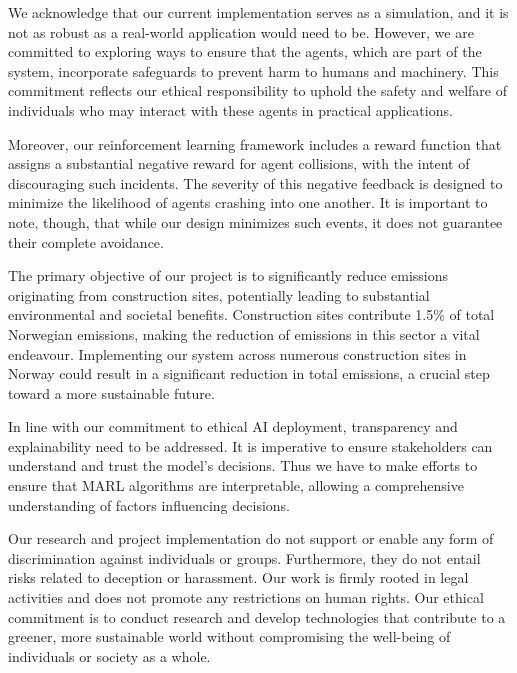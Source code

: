 \documentclass[conference]{IEEEtran}
\begin{document}
We acknowledge that our current implementation serves as a simulation, and it is not as robust as a
real-world application would need to be. However, we are committed to exploring ways to ensure that the
agents, which are part of the system, incorporate safeguards to prevent harm to humans and machinery.
This commitment reflects our ethical responsibility to uphold the safety and welfare of individuals who
may interact with these agents in practical applications.

Moreover, our reinforcement learning framework includes a reward function that assigns a substantial
negative reward for agent collisions, with the intent of discouraging such incidents. The severity of
this negative feedback is designed to minimize the likelihood of agents crashing into one another. It
is important to note, though, that while our design minimizes such events, it does not guarantee their
complete avoidance.


The primary objective of our project is to significantly reduce \coo{} emissions originating from
construction sites, potentially leading to substantial environmental and societal benefits.
Construction sites contribute 1.5\% of total Norwegian \coo{} emissions, making the reduction of
emissions in this sector a vital endeavour. Implementing our system across numerous construction sites
in Norway could result in a significant reduction in total \coo{} emissions, a crucial step toward a more
sustainable future.

In line with our commitment to ethical AI deployment, transparency and explainability need to be
addressed. It is imperative to ensure stakeholders can understand and trust the model's decisions.
Thus we have to make efforts to ensure that MARL algorithms are interpretable, allowing a comprehensive
understanding of factors influencing decisions.

Our research and project implementation do not support or enable any form of discrimination against
individuals or groups. Furthermore, they do not entail risks related to deception or harassment.
Our work is firmly rooted in legal activities and does not promote any restrictions on human rights.
Our ethical commitment is to conduct research and develop technologies that contribute to a greener,
more sustainable world without compromising the well-being of individuals or society as a whole.





\end{document}
